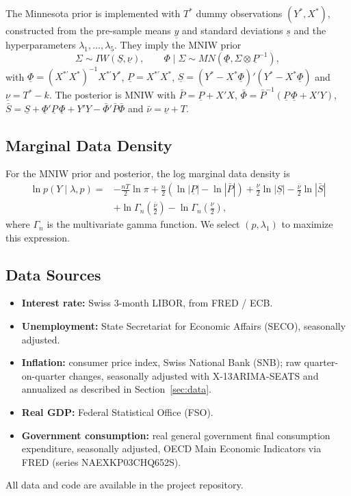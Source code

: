 \documentclass[11pt]{article}
\begin{document}
The Minnesota prior is implemented with $T^*$ dummy observations $(Y^*, X^*)$, constructed from the pre-sample means $\underline{y}$ and standard deviations $\underline{s}$ and the hyperparameters $\lambda_1, \dots, \lambda_5$. They imply the MNIW prior
\[
  \Sigma \sim IW(\underline{S}, \underline{\nu}), \qquad \Phi \mid \Sigma \sim MN(\underline{\Phi}, \Sigma \otimes \underline{P}^{-1}),
\]
with $\underline{\Phi} = (X^{*\prime} X^*)^{-1} X^{*\prime} Y^*$, $\underline{P} = X^{*\prime} X^*$, $\underline{S} = (Y^* - X^* \underline{\Phi})'(Y^* - X^* \underline{\Phi})$ and $\underline{\nu} = T^* - k$. The posterior is MNIW with $\bar P = \underline{P} + X'X$, $\bar\Phi = \bar P^{-1}(\underline{P}\,\underline{\Phi} + X'Y)$, $\bar S = \underline{S} + \underline{\Phi}'\underline{P}\,\underline{\Phi} + Y'Y - \bar\Phi'\bar P \bar\Phi$ and $\bar\nu = \underline{\nu} + T$.

\subsection{Marginal Data Density}
\label{app:mdd}

For the MNIW prior and posterior, the log marginal data density is
\begin{align*}
  \ln p(Y \mid \lambda, p) = {} & -\frac{nT}{2} \ln \pi + \frac{n}{2}\left(\ln|\underline{P}| - \ln|\bar P|\right) + \frac{\underline{\nu}}{2} \ln|\underline{S}| - \frac{\bar\nu}{2} \ln|\bar S| \\
  & + \ln \Gamma_n\!\left(\frac{\bar\nu}{2}\right) - \ln \Gamma_n\!\left(\frac{\underline{\nu}}{2}\right),
\end{align*}
where $\Gamma_n$ is the multivariate gamma function. We select $(p, \lambda_1)$ to maximize this expression.

\subsection{Data Sources}

\begin{itemize}
  \item \textbf{Interest rate:} Swiss 3-month LIBOR, from FRED / ECB.
  \item \textbf{Unemployment:} State Secretariat for Economic Affairs (SECO), seasonally adjusted.
  \item \textbf{Inflation:} consumer price index, Swiss National Bank (SNB); raw quarter-on-quarter changes, seasonally adjusted with X-13ARIMA-SEATS and annualized as described in Section~\ref{sec:data}.
  \item \textbf{Real GDP:} Federal Statistical Office (FSO).
  \item \textbf{Government consumption:} real general government final consumption expenditure, seasonally adjusted, OECD Main Economic Indicators via FRED (series NAEXKP03CHQ652S).
\end{itemize}
All data and code are available in the project repository.
\end{document}
